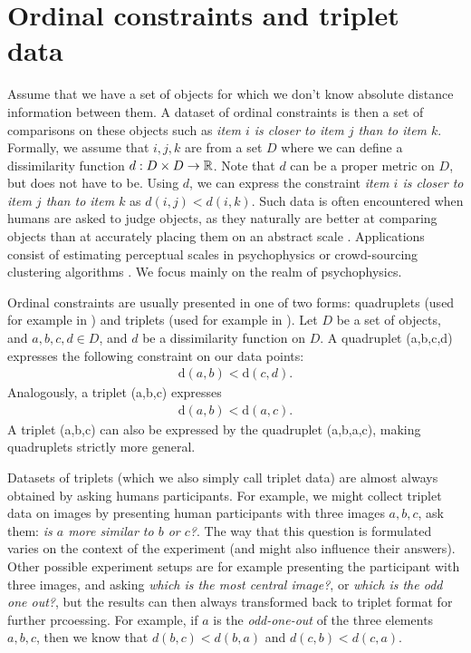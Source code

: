 \section{Ordinal constraints and triplet data}
Assume that we have a set of objects for which we don't know absolute distance information
between them. 
A dataset of ordinal constraints is then a set of comparisons on these
objects such as \textit{item $i$ is closer to item $j$ than to item $k$}. 
Formally, we assume that $i, j, k$ are from 
a set $D$ where we can define a dissimilarity function $d: D \times D \to \mathbb{R}$. Note that $d$ can be a proper metric on $D$, but does not have to be.
Using $d$, we can express the constraint \textit{item $i$ is closer to item $j$ than to item $k$} 
as $d(i, j) < d(i, k)$. Such data is often encountered when humans are asked to judge objects, 
as they naturally are better at comparing objects
than at accurately placing them on an abstract scale \citep{demiralpLearningPerceptualKernels2014}. 
Applications consist of estimating perceptual scales in psychophysics 
\citep{haghiriEstimationPerceptualScales2020} or crowd-sourcing clustering algorithms \citep{ukkonenCrowdsourcedCorrelationClustering2017}. 
We focus mainly on the realm of psychophysics.

Ordinal constraints are usually presented in one of two forms: quadruplets (used for example in \cite{ghoshdastidarFoundationsComparisonBasedHierarchical2019}) and triplets (used for example in \cite{vankadaraInsightsOrdinalEmbedding2021,haghiriComparisonBasedFrameworkPsychophysics2019}).
Let $D$ be a set of objects, and $a,b,c,d \in D$, and $d$ be a dissimilarity function on $D$.
A quadruplet (a,b,c,d) expresses the following constraint on our data points: 
\begin{align*}
\text{d}(a,b) < \text{d}(c,d)
.\end{align*}
Analogously, a triplet (a,b,c) expresses 
\begin{align*}
\text{d}(a,b) < \text{d}(a,c) 
.\end{align*}
A triplet (a,b,c) can also be expressed by the quadruplet (a,b,a,c), making quadruplets strictly more general. 

Datasets of triplets (which we also simply call triplet data) are almost always obtained by asking humans participants. For example, we might 
collect triplet data on images by presenting human participants with three images $a,b,c$, 
ask them: \textit{is $a$ more similar to $b$ or $c$?}.
The way that this question is formulated varies on the context of the experiment (and might also influence their answers). 
Other possible experiment setups are for example presenting the participant with three images, and asking \textit{which is the most central image?}, or \textit{which is the odd one out?},
but the results can then always transformed back to triplet format for further prcoessing. 
For example, if $a$ is the \textit{odd-one-out} of the three elements $a,b,c$, 
then we know that $d(b,c) < d(b,a)$ and $d(c, b) < d(c,a)$. 

